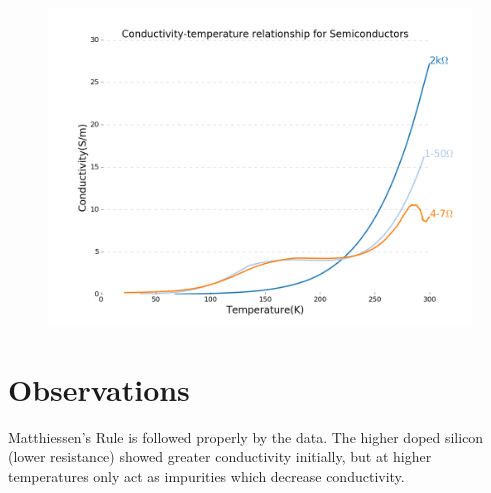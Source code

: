 \documentclass{article}
\begin{document}
\begin{figure}[h!]
\centering
\includegraphics[scale=0.4]{semiconductors2.png}
\end{figure}

\section{Observations}

Matthiessen's Rule is followed properly by the data. The higher doped silicon (lower resistance) showed greater conductivity initially, but at higher temperatures only act as impurities which decrease conductivity.
\end{document}
